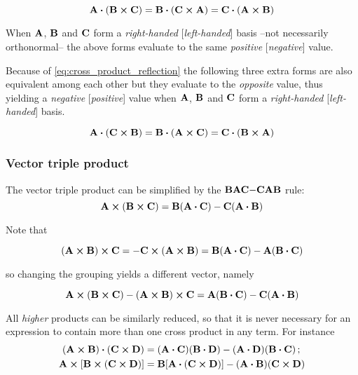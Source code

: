 \begin{equation}
\vb{A} \vdot (\vb{B} \cross \vb{C}) = \vb{B} \vdot (\vb{C} \cross \vb{A}) = \vb{C} \vdot (\vb{A} \cross \vb{B})
\label{eq:scalar_triple_product}
\end{equation}

When $\vb{A}$, $\vb{B}$ and $\vb{C}$ form a \textit{right-handed} [\textit{left-handed}] basis --not necessarily orthonormal-- the above forms evaluate to the same \textit{positive} [\textit{negative}] value.  

Because of \ref{eq:cross_product_reflection} the following three extra forms are also equivalent among each other but they evaluate to the \textit{opposite} value, thus yielding a \textit{negative} [\textit{positive}] value when $\vb{A}$, $\vb{B}$ and $\vb{C}$ form a \textit{right-handed} [\textit{left-handed}] basis.

\begin{equation}
\vb{A} \vdot (\vb{C} \cross \vb{B}) = \vb{B} \vdot (\vb{A} \cross \vb{C}) = \vb{C} \vdot (\vb{B} \cross \vb{A})
\end{equation}

\subsubsection{Vector triple product}

The vector triple product can be simplified by the $\vb{BAC}\mathbf{-}\vb{CAB}$ rule:
\begin{equation}
\vb{A} \cross (\vb{B} \cross \vb{C}) = \vb{B} (\vb{A} \vdot \vb{C}) - \vb{C} (\vb{A} \vdot \vb{B})
\label{eq:vector_triple_product}
\end{equation}

Note that 

\begin{equation*}
(\vb{A} \cross \vb{B}) \cross \vb{C} = - \vb{C} \cross (\vb{A} \cross \vb{B}) = \vb{B} (\vb{A} \vdot \vb{C}) - \vb{A} (\vb{B} \vdot \vb{C})
\end{equation*}

so changing the grouping yields a different vector, namely

\begin{equation*}
\vb{A} \cross (\vb{B} \cross \vb{C}) - (\vb{A} \cross \vb{B}) \cross \vb{C} = \vb{A} (\vb{B} \vdot \vb{C})  - \vb{C} (\vb{A} \vdot \vb{B})
\end{equation*}

All \textit{higher} products can be similarly reduced, so that it is never necessary for an expression to contain more than one cross product in any term. For instance
\begin{equation}
\begin{aligned} 
(\vb{A} \cross \vb{B}) \vdot (\vb{C} \cross \vb{D}) &= (\vb{A} \vdot \vb{C}) (\vb{B} \vdot \vb{D}) - (\vb{A} \vdot \vb{D}) (\vb{B} \vdot \vb{C})\, ;  \\
\vb{A} \cross [\vb{B} \cross (\vb{C} \cross \vb{D})] &= \vb{B} [\vb{A} \vdot (\vb{C} \cross \vb{D})] -  (\vb{A} \vdot \vb{B})(\vb{C} \cross \vb{D})
\end{aligned}
\end{equation}

